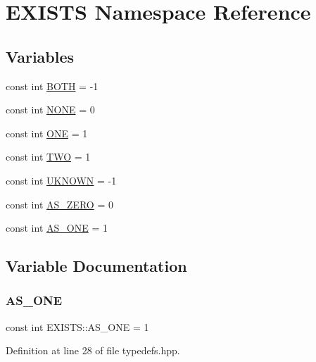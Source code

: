 \hypertarget{namespace_e_x_i_s_t_s}{}\section{E\+X\+I\+S\+TS Namespace Reference}
\label{namespace_e_x_i_s_t_s}
\subsection*{Variables}
\begin{DoxyCompactItemize}
\item 
const int \hyperlink{namespace_e_x_i_s_t_s_a256db431572e1e7f26f8dfa6c9cae9bd}{B\+O\+TH} = -\/1
\item 
const int \hyperlink{namespace_e_x_i_s_t_s_a2f75d813424980b47f3e7c9608fb8416}{N\+O\+NE} = 0
\item 
const int \hyperlink{namespace_e_x_i_s_t_s_a4c3717397d716d2bbd69d8239b3de033}{O\+NE} = 1
\item 
const int \hyperlink{namespace_e_x_i_s_t_s_ad76d02e8eb6d20715d333b72394b0648}{T\+WO} = 1
\item 
const int \hyperlink{namespace_e_x_i_s_t_s_a81eb362d951445c658942a433afddb97}{U\+K\+N\+O\+WN} = -\/1
\item 
const int \hyperlink{namespace_e_x_i_s_t_s_a03d550dd049f50f852b8fb4caa48238a}{A\+S\+\_\+\+Z\+E\+RO} = 0
\item 
const int \hyperlink{namespace_e_x_i_s_t_s_a735e5ca6565905e84346e3ff62842a0a}{A\+S\+\_\+\+O\+NE} = 1
\end{DoxyCompactItemize}


\subsection{Variable Documentation}
\mbox{\label{namespace_e_x_i_s_t_s_a735e5ca6565905e84346e3ff62842a0a}} 
\subsubsection{\texorpdfstring{A\+S\+\_\+\+O\+NE}{AS\_ONE}}
{\footnotesize\ttfamily const int E\+X\+I\+S\+T\+S\+::\+A\+S\+\_\+\+O\+NE = 1}



Definition at line 28 of file typedefs.\+hpp.

